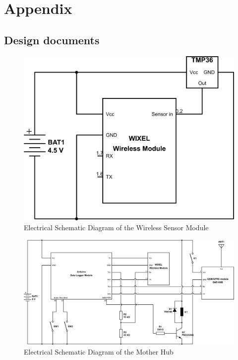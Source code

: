 \section*{Appendix}
\subsection*{Design documents}

\begin{figure}[H]
\centering
\includegraphics[width=0.5\linewidth]{graphics/sensormodule_schematic}
\caption{Electrical Schematic Diagram of the Wireless Sensor Module\label{fig:sensormodule_schematic}}
\end{figure}

\begin{figure}[H]
\centering
\includegraphics[width=1\linewidth]{graphics/motherhub_schematic}
\caption{Electrical Schematic Diagram of the Mother Hub\label{fig:motherhub_schematic}}
\end{figure}

